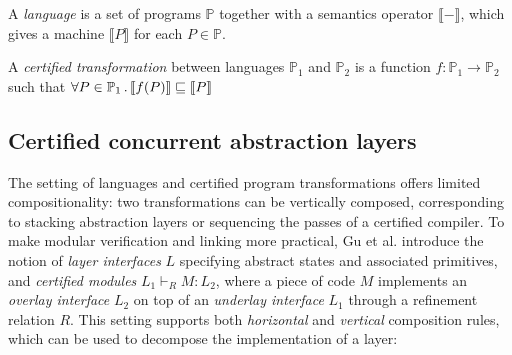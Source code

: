 {\begin{definition} \label{def:certified-trans}
A \emph{language} is a set of programs $\mathbb{P}$
together with a semantics operator $\llbracket - \rrbracket$,
which gives a machine $\llbracket P \rrbracket$ for each $P \in \mathbb{P}$.

A \emph{certified transformation} between languages $\mathbb{P}_1$ and $\mathbb{P}_2$
is a function $f : \mathbb{P}_1 \rightarrow \mathbb{P}_2$ such that
$\forall P \in \mathbb{P}_1 \,.\,
\llbracket f(P) \rrbracket \refines \llbracket P \rrbracket$
\end{definition}

\subsection{Certified concurrent abstraction layers}
The setting of languages and certified program transformations
offers limited compositionality:
two transformations can be vertically composed,
corresponding to stacking abstraction layers
or sequencing the passes of a certified compiler.
To make modular verification and linking more practical, Gu et
al. \cite{dscal15} introduce the notion of \emph{layer interfaces} $L$
specifying abstract states and associated primitives,
and \emph{certified modules} $L_1 \vdash_R M : L_2$,
where a piece of code $M$
implements an \emph{overlay interface} $L_2$ on top of an
\emph{underlay interface} $L_1$ through a refinement relation $R$.
This setting supports both \emph{horizontal} and \emph{vertical} composition rules,
which can be used to decompose the implementation of a layer:

\vspace{-5pt}
{\small
\begin{mathpar}
\end{mathpar}
\vspace{-5pt}
\begin{mathpar}
\end{mathpar}
\vspace{-5pt}
}%

}
